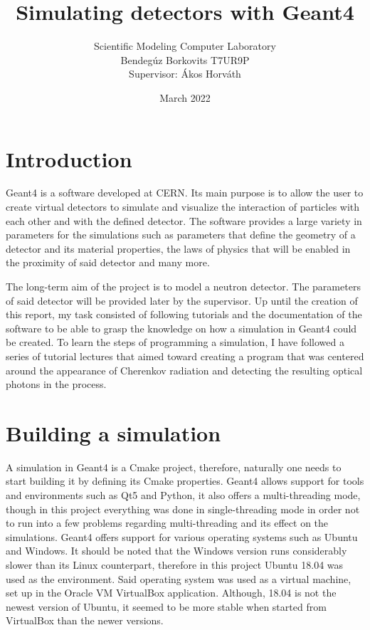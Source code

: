 \documentclass[12pt,twocolumn]{article}
\title{Simulating detectors with Geant4}
\author{Scientific Modeling Computer Laboratory\\Bendegúz Borkovits T7UR9P\\Supervisor: Ákos Horváth}
\date{March 2022}
\begin{document}
\maketitle

\section{Introduction}

Geant4 is a software developed at CERN. Its main purpose is to allow the user to create virtual detectors to simulate and visualize the interaction of particles with each other and with the defined detector. The software provides a large variety in parameters for the simulations such as parameters that define the geometry of a detector and its material properties, the laws of physics that will be enabled in the proximity of said detector and many more.

The long-term aim of the project is to model a neutron detector. The parameters of said detector will be provided later by the supervisor. Up until the creation of this report, my task consisted of following tutorials \cite{youtube} and the documentation \cite{geant} of the software to be able to grasp the knowledge on how a simulation in Geant4 could be created. To learn the steps of programming a simulation, I have followed a series of tutorial lectures that aimed toward creating a program that was centered around the appearance of Cherenkov radiation and detecting the resulting optical photons in the process.

\section{Building a simulation}

A simulation in Geant4 is a Cmake project, therefore, naturally one needs to start building it by defining its Cmake properties. Geant4 allows support for tools and environments such as Qt5 and Python, it also offers a multi-threading mode, though in this project everything was done in single-threading mode in order not to run into a few problems regarding multi-threading and its effect on the simulations. Geant4 offers support for various operating systems such as Ubuntu and Windows. It should be noted that the Windows version runs considerably slower than its Linux counterpart, therefore in this project Ubuntu 18.04 was used as the environment. Said operating system was used as a virtual machine, set up in the Oracle VM VirtualBox application. Although, 18.04 is not the newest version of Ubuntu, it seemed to be more stable when started from VirtualBox than the newer versions.
\end{document}
